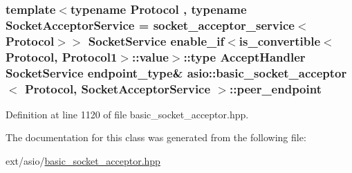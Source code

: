 \subsubsection[{peer\+\_\+endpoint}]{\setlength{\rightskip}{0pt plus 5cm}template$<$typename Protocol , typename Socket\+Acceptor\+Service  = socket\+\_\+acceptor\+\_\+service$<$\+Protocol$>$$>$ Socket\+Service {\bf enable\+\_\+if}$<$is\+\_\+convertible$<$Protocol, Protocol1$>$\+::value$>$\+::type Accept\+Handler Socket\+Service {\bf endpoint\+\_\+type}\& {\bf asio\+::basic\+\_\+socket\+\_\+acceptor}$<$ Protocol, Socket\+Acceptor\+Service $>$\+::peer\+\_\+endpoint}\label{classasio_1_1basic__socket__acceptor_a9d2810f536fb7c7ad036abadb5750ce7}


Definition at line 1120 of file basic\+\_\+socket\+\_\+acceptor.\+hpp.



The documentation for this class was generated from the following file\+:\begin{DoxyCompactItemize}
\item 
ext/asio/\hyperlink{basic__socket__acceptor_8hpp}{basic\+\_\+socket\+\_\+acceptor.\+hpp}\end{DoxyCompactItemize}
